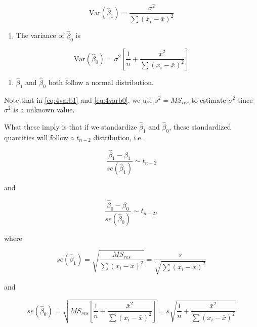 \documentclass[
]{book}
\providecommand{\tightlist}{%
  \setlength{\itemsep}{0pt}\setlength{\parskip}{0pt}}
\begin{document}
\begin{equation} 
\mbox{Var}(\hat{\beta}_1) = \frac{\sigma^{2}}{\sum{(x_{i}-\bar{x})^{2}}}
\label{eq:4varb1}
\end{equation}

\begin{enumerate}
\def\labelenumi{\arabic{enumi}.}
\setcounter{enumi}{2}
\tightlist
\item
  The variance of \(\hat{\beta}_0\) is
\end{enumerate}

\begin{equation} 
\mbox{Var}(\hat{\beta}_0) = \sigma^2 \left[\frac{1}{n} + \frac{\bar{x}^2}{\sum (x_i -\bar{x})^2}\right]
\label{eq:4varb0}
\end{equation}

\begin{enumerate}
\def\labelenumi{\arabic{enumi}.}
\setcounter{enumi}{3}
\tightlist
\item
  \(\hat{\beta}_1\) and \(\hat{\beta}_0\) both follow a normal distribution.
\end{enumerate}

Note that in \eqref{eq:4varb1} and \eqref{eq:4varb0}, we use \(s^2 = MS_{res}\) to estimate \(\sigma^2\) since \(\sigma^2\) is a unknown value.

What these imply is that if we standardize \(\hat{\beta}_1\) and \(\hat{\beta}_0\), these standardized quantities will follow a \(t_{n-2}\) distribution, i.e.

\begin{equation} 
\frac{\hat{\beta}_1 - \beta_1}{se(\hat{\beta}_1)}\sim t_{n-2}
\label{eq:distb1}
\end{equation}

and

\begin{equation} 
\frac{\hat{\beta}_0 - \beta_0}{se(\hat{\beta}_0)}\sim t_{n-2},
\label{eq:distb0}
\end{equation}

where

\begin{equation}
se(\hat{\beta}_1) = \sqrt{\frac{MS_{res}}{\sum{(x_{i}-\bar{x})^{2}}}} = \frac{s}{\sqrt{\sum{(x_{i}-\bar{x})^{2}}}}
\label{eq:seb1}
\end{equation}

and

\begin{equation} 
se(\hat{\beta}_0) = \sqrt{MS_{res}\left[\frac{1}{n} + \frac{\bar{x}^2}{\sum (x_i -\bar{x})^2}\right]} = s \sqrt{\frac{1}{n} + \frac{\bar{x}^2}{\sum (x_i -\bar{x})^2}}
\label{eq:seb0}
\end{equation}
\end{document}

